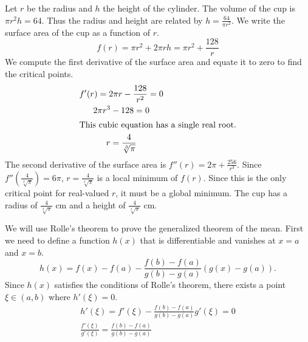\begin{Solution}
  \label{solution surface area cup}
  Let $r$ be the radius and $h$ the height of the cylinder.  The volume of
  the cup is $\pi r^2 h = 64$.  Thus the radius and height are related by
  $h = \frac{64}{\pi r^2}$.  We write the surface area of the cup as a 
  function of $r$.
  \[
  f(r) = \pi r^2 + 2 \pi r h = \pi r^2 + \frac{128}{r}
  \]
  We compute the first derivative of the surface area and equate 
  it to zero to find the critical points.
  \begin{gather*}
    f'(r) = 2 \pi r - \frac{128}{r^2} = 0
    \\
    2 \pi r^3 - 128 = 0
    \\
    \intertext{This cubic equation has a single real root.}
    r = \frac{4}{\sqrt[3]{\pi}}
  \end{gather*}
  The second derivative of the surface area is
  $f''(r) = 2 \pi + \frac{256}{r^3}$.  Since
  $f''(\frac{4}{\sqrt[3]{\pi}}) = 6\pi$, $r=\frac{4}{\sqrt[3]{\pi}}$ is a
  local minimum of $f(r)$.  Since this is the only critical point for
  real-valued $r$, it must be a global minimum.
  The cup has a radius of $\frac{4}{\sqrt[3]{\pi}}$ cm and a height of
  $\frac{4}{\sqrt[3]{\pi}}$ cm.
\end{Solution}





\begin{Solution}
  \label{solution generalized theorem of the mean}
  We will use Rolle's theorem to prove the generalized theorem of the 
  mean.  First we need to define a function $h(x)$ that is differentiable
  and vanishes at $x = a$ and $x = b$.
  \[
  h(x) = f(x) - f(a) - \frac{f(b) - f(a)}{g(b) - g(a)} (g(x) - g(a)).
  \]
  Since $h(x)$ satisfies the conditions of Rolle's theorem, there exists a 
  point $\xi \in (a,b)$ where $h'(\xi) = 0$.
  \begin{gather*}
    h'(\xi) = f'(\xi) - \frac{f(b) - f(a)}{g(b) - g(a)} g'(\xi) = 0
    \\
    \frac{f'(\xi)}{g'(\xi)} = \frac{f(b) - f(a)}{g(b) - g(a)}
  \end{gather*}
\end{Solution}



